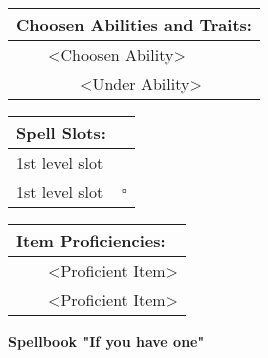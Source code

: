 \documentclass[11pt]{article}
\newcommand{\done}{\rlap{$\square$}{\raisebox{2pt}{\large\hspace{1pt}\ding{51}}}}
\newcommand{\available}{$\square$}
\newcommand{\tabitem}{~~\llap{--}~~}
\newcommand{\tabtabitem}{~~~~~~\llap{$\bullet$}~~}
\begin{document}
\begin{multicols}{2}
\vspace{4mm}

\noindent \begin{tabularx}{\linewidth}{@{}l}
{\Large \textbf{Choosen Abilities and Traits:}} \\
\hline
\tabitem <Choosen Ability> \\
\tabtabitem <Under Ability>
		\end{tabularx}

\vspace{4mm}

\noindent \begin{tabularx}{\linewidth}{@{}l c}
{\Large \textbf{Spell Slots:}} \\
\hline
1st level slot & \done \\
1st level slot & \available
		\end{tabularx}

\vspace{4mm}

\noindent \begin{tabularx}{\linewidth}{@{}l}
{\Large \textbf{Item Proficiencies:}} \\
\hline
\tabitem <Proficient Item> \\
\tabitem <Proficient Item>
		\end{tabularx}
	\end{multicols}

\clearpage

	\begin{center}
{\LARGE \textbf{Spellbook "If you have one"}}
	\end{center}
\end{document}

